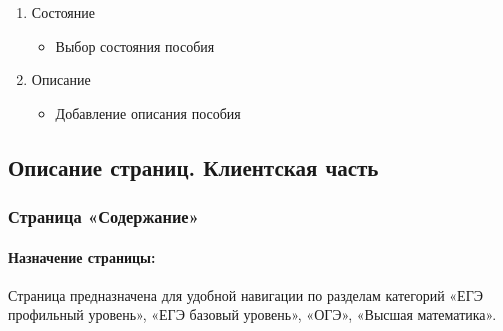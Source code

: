 \begin{enumerate}
\begin{enumerate}
\begin{enumerate}
			\item Состояние
			\begin{itemize}
				\item Выбор состояния пособия
			\end{itemize}

			\item Описание
			\begin{itemize}
				\item Добавление описания пособия
			\end{itemize}

		\end{enumerate}
	\end{enumerate}
\end{enumerate}


\subsection{Описание страниц. Клиентская часть}
\subsubsection{Страница «Содержание»}
\paragraph{Назначение страницы:} Страница предназначена для удобной навигации по разделам категорий «ЕГЭ профильный уровень», «ЕГЭ базовый уровень», «ОГЭ», «Высшая математика».

